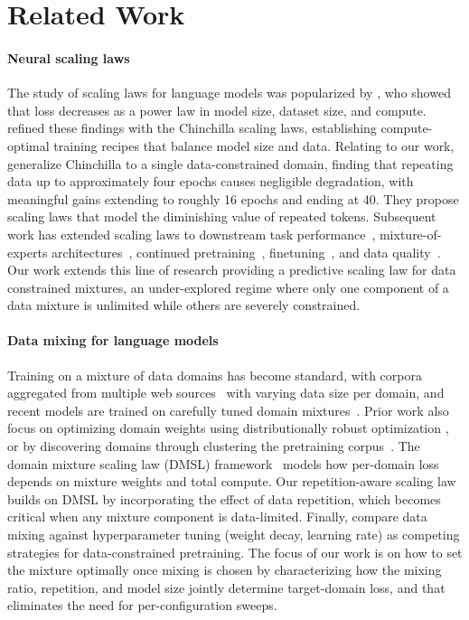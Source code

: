 \section{Related Work}

\paragraph{Neural scaling laws}
The study of scaling laws for language models was popularized by \citet{kaplan2020scaling}, who showed that loss decreases as a power law in model size, dataset size, and compute. \citet{hoffmann2022training} refined these findings with the Chinchilla scaling laws, establishing compute-optimal training recipes that balance model size and data. Relating to our work, \citet{muennighoff2023scaling} generalize Chinchilla to a single data-constrained domain, finding that repeating data up to approximately four epochs causes negligible degradation, with meaningful gains extending to roughly 16 epochs and ending at 40. They propose scaling laws that model the diminishing value of repeated tokens. Subsequent work has extended scaling laws to downstream task performance~\citep{wei2022emergent}, mixture-of-experts architectures~\citep{abnar2025parameters,krajewski2024scaling,wang2024scaling}, continued pretraining~\citep{que2024d,liew2025acceleration,seto2026optimal}, finetuning~\citep{bethune2025scaling,zhang2024scaling}, and data quality~\citep{chang2024scaling}.
Our work extends this line of research providing a predictive scaling law for data constrained mixtures, an under-explored regime where only one component of a data mixture is unlimited while others are severely constrained.

\paragraph{Data mixing for language models}
Training on a mixture of data domains has become standard, with corpora aggregated from multiple web sources~\citep{gao2020pile,cerebras2023slimpajama,soldaini2024dolma} with varying data size per domain, and recent models are trained on carefully tuned domain mixtures~\citep{bakouch2025smollm3,olmo2025olmo}. Prior work also focus on optimizing domain weights using distributionally robust optimization  \citep{xie2024doremi,fan2024doge}, or by discovering domains through clustering the pretraining corpus~\citep{diaonemotron,grangier2025task}.
The domain mixture scaling law (DMSL) framework~\citep{ye2024data,shukor2025scalinglawsoptimaldata} models how per-domain loss depends on mixture weights and total compute. Our repetition-aware scaling law builds on DMSL by incorporating the effect of data repetition, which becomes critical when any mixture component is data-limited. Finally, \citet{anonymous2026mixdonttune} compare data mixing against hyperparameter tuning (weight decay, learning rate) as competing strategies for data-constrained pretraining.
The focus of our work is on how to set the mixture optimally once mixing is chosen by characterizing how the mixing ratio, repetition, and model size jointly determine target-domain loss, and that eliminates the need for per-configuration sweeps.


